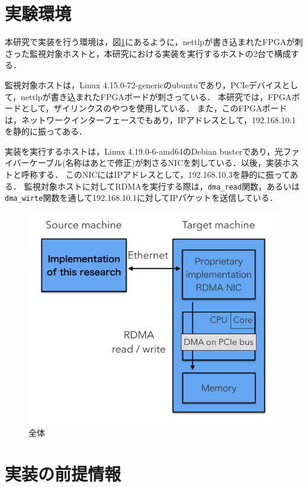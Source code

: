 \section{実験環境}

本研究で実装を行う環境は，図\ref{fig:zentai}にあるように，nettlpが書き込まれたFPGAが刺さった監視対象ホストと，本研究における実装を実行するホストの2台で構成する．

監視対象ホストは，Linux 4.15.0-72-genericのubuntuであり，PCIeデバイスとして，nettlpが書き込まれたFPGAボードが刺さっている．
本研究では，FPGAボードとして，ザイリンクスのやつを使用している．
また，このFPGAボードは，ネットワークインターフェースでもあり，IPアドレスとして，192.168.10.1を静的に振ってある．

実装を実行するホストは，Linux 4.19.0-6-amd64のDebian busterであり，光ファイバーケーブル(名称はあとで修正)が刺さるNICを刺している．以後，実装ホストと呼称する．
このNICにはIPアドレスとして，192.168.10.3を静的に振ってある．
監視対象ホストに対してRDMAを実行する際は，\verb|dma_read|関数，あるいは\verb|dma_wirte|関数を通して192.168.10.1に対してIPパケットを送信している．

\begin{figure}[htbp]
    \caption{全体}
    \label{fig:zentai}
    \begin{center}
        \includegraphics[bb=0 0 1000 800,width=15cm]{img/zentai.png}
    \end{center}
\end{figure}

\section{実装の前提情報}

